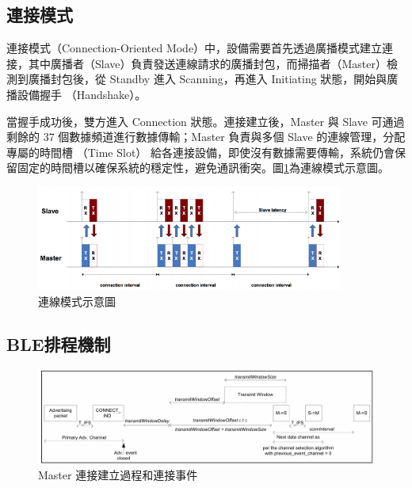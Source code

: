 \begin{ZhChapter}
\subsection{連接模式}

連接模式（Connection-Oriented Mode）中，設備需要首先透過廣播模式建立連接，其中廣播者（Slave）負責發送連線請求的廣播封包，而掃描者（Master）檢測到廣播封包後，從 Standby 進入 Scanning，再進入 Initiating 狀態，開始與廣播設備握手 （Handshake）。

當握手成功後，雙方進入 Connection 狀態。連接建立後，Master 與 Slave 可通過剩餘的 37 個數據頻道進行數據傳輸；Master 負責與多個 Slave 的連線管理，分配專屬的時間槽 （Time Slot） 給各連接設備，即使沒有數據需要傳輸，系統仍會保留固定的時間槽以確保系統的穩定性，避免通訊衝突。圖\ref{fig: 連線模式示意圖}為連線模式示意圖。

\begin{figure}[htbp]
    \centering
    \includegraphics[width = 0.9\textwidth]{image/連線模式示意圖.png}
    \caption{連線模式示意圖\cite{9035389}}
    \label{fig: 連線模式示意圖}
\end{figure}

\subsection{BLE排程機制}

\begin{figure}[htbp]
    \centering
    \includegraphics[width = 1\textwidth]{image/Master 連接建立過程和連接事件.png}
    \caption{Master 連接建立過程和連接事件\cite{bluetooth2016core}}
    \label{fig: Master 連接建立過程和連接事件}
\end{figure}


\end{ZhChapter}
